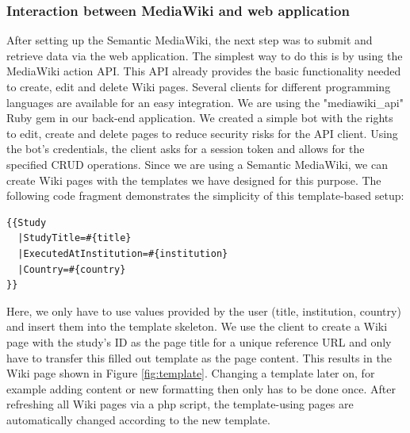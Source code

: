 \documentclass[10pt]{article}
\begin{document}
\subsubsection{Interaction between MediaWiki and web application}
After setting up the Semantic MediaWiki, the next step was to submit and retrieve data via the web application. The simplest way to do this is by using the MediaWiki action API. This API already provides the basic functionality needed to create, edit and delete Wiki pages. Several clients for different programming languages are available for an easy integration. We are using the "mediawiki\_api" Ruby gem in our back-end application. We created a simple bot with the rights to edit, create and delete pages to reduce security risks for the API client. Using the bot's credentials, the client asks for a session token and allows for the specified CRUD operations. Since we are using a Semantic MediaWiki, we can create Wiki pages with the templates we have designed for this purpose. The following code fragment demonstrates the simplicity of this template-based setup:
\noindent

\begin{minipage}{0.95\textwidth}
\begin{lstlisting}[frame=single]
{{Study
  |StudyTitle=#{title}
  |ExecutedAtInstitution=#{institution}
  |Country=#{country}
}}
\end{lstlisting}
\end{minipage}

Here, we only have to use values provided by the user (title, institution, country) and insert them into the template skeleton. We use the client to create a Wiki page with the study's ID as the page title for a unique reference URL and only have to transfer this filled out template as the page content. This results in the Wiki page shown in Figure \ref{fig:template}. Changing a template later on, for example adding content or new formatting then only has to be done once. After refreshing all Wiki pages via a php script, the template-using pages are automatically changed according to the new template.\\
\end{document}
